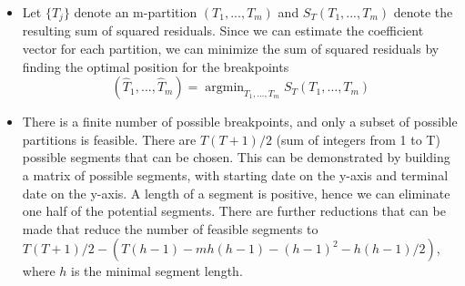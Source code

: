 \documentclass[presentation.tex]{subfiles}
\begin{document}
\begin{frame}
  \frametitle{}
\begin{itemize}
\item
Let $\{T_j\}$ denote an m-partition $(T_1, ..., T_m)$ and $S_T(T_1, ..., T_m)$
denote the resulting sum of squared residuals. Since we can estimate the
coefficient vector for each partition, we can minimize the sum of
squared residuals by finding the optimal position for the breakpoints
\[
(\hat{T}_1, ..., \hat{T}_m) = \operatorname{argmin}_{T_{1}, \ldots, T_{m}}
S_{T}\left(T_{1}, \ldots, T_{m}\right)
\]
\item
There is a finite number of possible breakpoints, and only a subset of
possible partitions is feasible. There are $T(T+1)/2$ (sum of integers from 1 to T)
possible segments that can be chosen. This can be demonstrated by building a
matrix of possible segments, with starting date on the y-axis and terminal date
on the y-axis. A length of a segment is positive, hence we can eliminate
one half of the potential segments. There are further reductions
that can be made that reduce the number of feasible segments to
$T(T+1)/2 - \left(T(h-1)-m h(h-1)-(h-1)^{2}-h(h-1) / 2\right)$, where $h$ is the minimal
segment length.
\end{itemize}
\end{frame}
\end{document}
